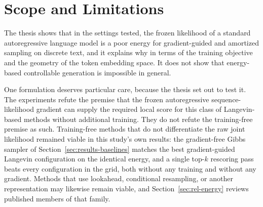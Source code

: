 \section{Scope and Limitations}
\label{sec:disc-scope}

The thesis shows that in the settings tested, the frozen likelihood of a standard autoregressive language model is a poor energy for gradient-guided and amortized sampling on discrete text, and it explains why in terms of the training objective and the geometry of the token embedding space. It does not show that energy-based controllable generation is impossible in general.

One formulation deserves particular care, because the thesis set out to test it. The experiments refute the premise that the frozen autoregressive sequence-likelihood gradient can supply the required local score for this class of Langevin-based methods without additional training. They do not refute the training-free premise as such. Training-free methods that do not differentiate the raw joint likelihood remained viable in this study's own results: the gradient-free Gibbs sampler of Section~\ref{sec:results-baselines} matches the best gradient-guided Langevin configuration on the identical energy, and a single top-$k$ rescoring pass beats every configuration in the grid, both without any training and without any gradient. Methods that use lookahead, conditional resampling, or another representation may likewise remain viable, and Section~\ref{sec:rel-energy} reviews published members of that family.


